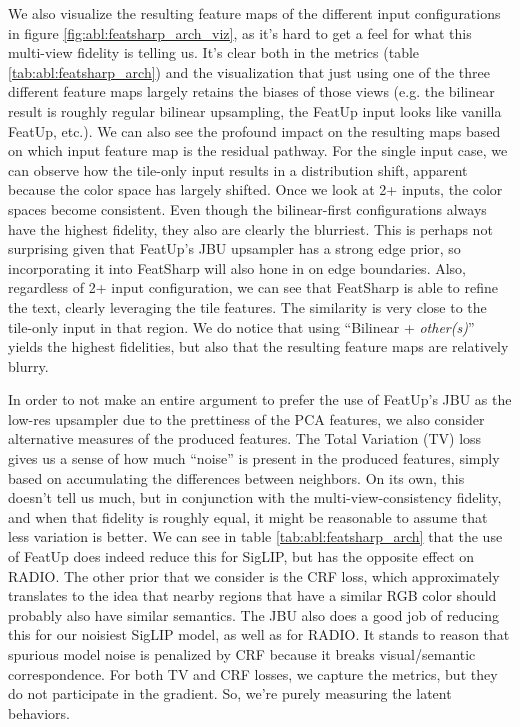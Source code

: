 \begin{table}[h]
    \label{tab:abl:featsharp_arch}
\end{table}

We also visualize the resulting feature maps of the different input configurations in figure \ref{fig:abl:featsharp_arch_viz}, as it's hard to get a feel for what this multi-view fidelity is telling us. It's clear both in the metrics (table \ref{tab:abl:featsharp_arch}) and the visualization that just using one of the three different feature maps largely retains the biases of those views (e.g. the bilinear result is roughly regular bilinear upsampling, the FeatUp input looks like vanilla FeatUp, etc.). We can also see the profound impact on the resulting maps based on which input feature map is the residual pathway. For the single input case, we can observe how the tile-only input results in a distribution shift, apparent because the color space has largely shifted. Once we look at 2+ inputs, the color spaces become consistent. Even though the bilinear-first configurations always have the highest fidelity, they also are clearly the blurriest. This is perhaps not surprising given that FeatUp's JBU upsampler has a strong edge prior, so incorporating it into FeatSharp will also hone in on edge boundaries. Also, regardless of 2+ input configuration, we can see that FeatSharp is able to refine the text, clearly leveraging the tile features. The similarity is very close to the tile-only input in that region. We do notice that using ``Bilinear + \textit{other(s)}'' yields the highest fidelities, but also that the resulting feature maps are relatively blurry. 

In order to not make an entire argument to prefer the use of FeatUp's JBU as the low-res upsampler due to the prettiness of the PCA features, we also consider alternative measures of the produced features. The Total Variation (TV) loss gives us a sense of how much ``noise'' is present in the produced features, simply based on accumulating the differences between neighbors. On its own, this doesn't tell us much, but in conjunction with the multi-view-consistency fidelity, and when that fidelity is roughly equal, it might be reasonable to assume that less variation is better. We can see in table \ref{tab:abl:featsharp_arch} that the use of FeatUp does indeed reduce this for SigLIP, but has the opposite effect on RADIO. The other prior that we consider is the CRF loss, which approximately translates to the idea that nearby regions that have a similar RGB color should probably also have similar semantics. The JBU also does a good job of reducing this for our noisiest SigLIP model, as well as for RADIO. It stands to reason that spurious model noise is penalized by CRF because it breaks visual/semantic correspondence. For both TV and CRF losses, we capture the metrics, but they do not participate in the gradient. So, we're purely measuring the latent behaviors.

